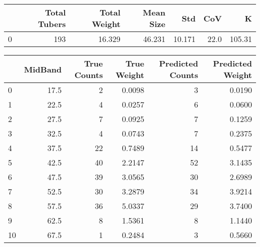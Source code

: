 \begin{tabular}{lrrrrrr}
\toprule
{} &  Total Tubers &  Total Weight &  Mean Size &     Std &   CoV &       K \\
\midrule
0 &           193 &        16.329 &     46.231 &  10.171 &  22.0 &  105.31 \\
\bottomrule
\end{tabular}

\begin{tabular}{lrrrrr}
\toprule
{} &  MidBand &  True Counts &  True Weight &  Predicted Counts &  Predicted Weight \\
\midrule
0  &     17.5 &            2 &       0.0098 &                 3 &            0.0190 \\
1  &     22.5 &            4 &       0.0257 &                 6 &            0.0600 \\
2  &     27.5 &            7 &       0.0925 &                 7 &            0.1259 \\
3  &     32.5 &            4 &       0.0743 &                 7 &            0.2375 \\
4  &     37.5 &           22 &       0.7489 &                14 &            0.5477 \\
5  &     42.5 &           40 &       2.2147 &                52 &            3.1435 \\
6  &     47.5 &           39 &       3.0565 &                30 &            2.6989 \\
7  &     52.5 &           30 &       3.2879 &                34 &            3.9214 \\
8  &     57.5 &           36 &       5.0337 &                29 &            3.7400 \\
9  &     62.5 &            8 &       1.5361 &                 8 &            1.1440 \\
10 &     67.5 &            1 &       0.2484 &                 3 &            0.5660 \\
\bottomrule
\end{tabular}

